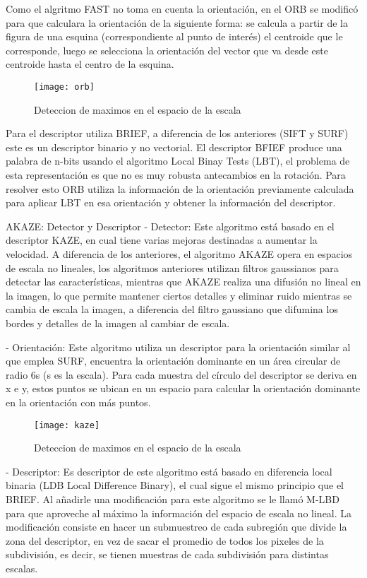 Como el algritmo FAST no toma en cuenta la orientación, en el ORB se modificó para que calculara la orientación de la siguiente forma: se calcula a partir de la figura de una esquina (correspondiente al punto de interés) el centroide que le corresponde, luego se selecciona la orientación del vector que va desde este centroide hasta el centro de la esquina.

\begin{figure}[H]
	\centering
	\texttt{[image: orb]}
	\caption[ORB - Espacio de escalas]{Deteccion de maximos en el espacio de la escala}
	\label{imagen:orb}
\end{figure}

Para el descriptor utiliza BRIEF, a diferencia de los anteriores (SIFT y SURF) este es un descriptor binario y no vectorial. El descriptor BFIEF produce una palabra de n-bits usando el algoritmo Local Binay Tests (LBT), el problema de esta representación es que no es muy robusta antecambios en la rotación. Para resolver esto ORB utiliza la información de la orientación previamente calculada para aplicar LBT en esa orientación y obtener la información del descriptor.

AKAZE: Detector y Descriptor
- Detector: Este algoritmo está basado en el descriptor KAZE, en cual tiene varias mejoras destinadas a aumentar la velocidad. A diferencia de los anteriores, el algoritmo AKAZE opera en espacios de escala no lineales, los algoritmos anteriores utilizan filtros gaussianos para detectar las características, mientras que AKAZE realiza una difusión no lineal en la imagen, lo que permite mantener ciertos detalles y eliminar ruido mientras se cambia de escala la imagen, a diferencia del filtro gaussiano que difumina los bordes y detalles de la imagen al cambiar de escala.

- Orientación: Este algoritmo utiliza un descriptor para la orientación similar al que emplea SURF, encuentra la orientación dominante en un área circular de radio 6s (s es la escala). Para cada muestra del círculo del descriptor se deriva en x e y, estos puntos se ubican en un espacio para calcular la orientación dominante en la orientación con más puntos.

\begin{figure}[H]
	\centering
	\texttt{[image: kaze]}
	\caption[KAZE - Espacio de escalas]{Deteccion de maximos en el espacio de la escala}
	\label{imagen:kaze}
\end{figure}

- Descriptor: Es descriptor de este algoritmo está basado en diferencia local binaria (LDB Local Difference Binary), el cual sigue el mismo principio que el BRIEF. Al añadirle una modificación para este algoritmo se le llamó M-LBD para que aproveche al máximo la información del espacio de escala no lineal. La modificación consiste en hacer un submuestreo de cada subregión que divide la zona del descriptor, en vez de sacar el promedio de todos los pixeles de la subdivisión, es decir, se tienen muestras de cada subdivisión para distintas escalas.


